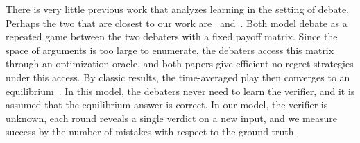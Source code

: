There is very little previous work that analyzes learning in the
setting of debate. Perhaps the two that are closest to our work
are~\citet{chen2023playing} and~\citet{buzaglo2025hidden}. Both model
debate as a repeated game between the two debaters with a fixed payoff
matrix. Since the space of arguments is too large to enumerate, the
debaters access this matrix through an optimization oracle, and both
papers give efficient no-regret strategies under this access. By
classic results, the time-averaged play then converges to an
equilibrium~\citep{freund1999adaptive,hart2000simple}. In this model,
the debaters never need to learn the verifier, and it is assumed that the equilibrium answer is correct.
In our model, the verifier is unknown, each round reveals a single
verdict on a new input, and we measure success by the number of
mistakes with respect to the ground truth.
